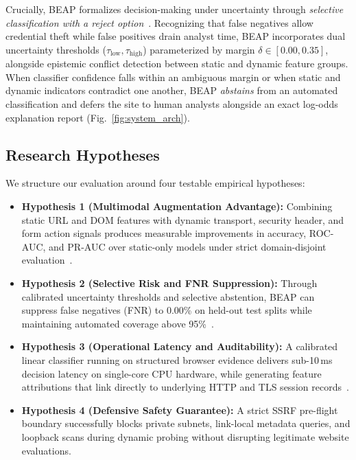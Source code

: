 \documentclass[conference]{IEEEtran}
\begin{document}
Crucially, BEAP formalizes decision-making under uncertainty through \textit{selective classification with a reject option}~\cite{calzarossa2025,bezerra2025}. Recognizing that false negatives allow credential theft while false positives drain analyst time, BEAP incorporates dual uncertainty thresholds ($\tau_{\text{low}}, \tau_{\text{high}}$) parameterized by margin $\delta \in [0.00, 0.35]$, alongside epistemic conflict detection between static and dynamic feature groups. When classifier confidence falls within an ambiguous margin or when static and dynamic indicators contradict one another, BEAP \textit{abstains} from an automated classification and defers the site to human analysts alongside an exact log-odds explanation report (Fig.~\ref{fig:system_arch}).

\subsection{Research Hypotheses}\label{research-hypotheses}

We structure our evaluation around four testable empirical hypotheses:
\begin{itemize}[leftmargin=2.5em]
    \item \textbf{Hypothesis 1 (Multimodal Augmentation Advantage):} Combining static URL and DOM features with dynamic transport, security header, and form action signals produces measurable improvements in accuracy, ROC-AUC, and PR-AUC over static-only models under strict domain-disjoint evaluation~\cite{ariyadasa2022,kalabarige2023}.
    \item \textbf{Hypothesis 2 (Selective Risk and FNR Suppression):} Through calibrated uncertainty thresholds and selective abstention, BEAP can suppress false negatives (FNR) to 0.00\% on held-out test splits while maintaining automated coverage above 95\%~\cite{calzarossa2025,bezerra2025}.
    \item \textbf{Hypothesis 3 (Operational Latency and Auditability):} A calibrated linear classifier running on structured browser evidence delivers sub-10\,ms decision latency on single-core CPU hardware, while generating feature attributions that link directly to underlying HTTP and TLS session records~\cite{chai2022,le2026}.
    \item \textbf{Hypothesis 4 (Defensive Safety Guarantee):} A strict SSRF pre-flight boundary successfully blocks private subnets, link-local metadata queries, and loopback scans during dynamic probing without disrupting legitimate website evaluations.
\end{itemize}
\end{document}
